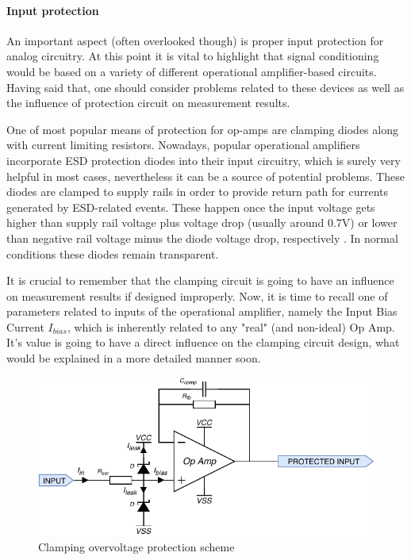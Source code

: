 \documentclass[12pt,a4paper]{article}
\begin{document}
\paragraph{Input protection}
An important aspect (often overlooked though) is proper input protection for analog circuitry. At this point it is vital to highlight that signal conditioning would be based on a variety of different operational amplifier-based circuits. Having said that, one should consider problems related to these devices as well as the influence of protection circuit on measurement results.
\par

One of most popular means of protection for op-amps are clamping diodes along with current limiting resistors. Nowadays, popular operational amplifiers incorporate ESD protection diodes into their input circuitry, which is surely very helpful in most cases, nevertheless it can be a source of potential problems. These diodes are clamped to supply rails in order to provide return path for currents generated by ESD-related events. These happen once the input voltage gets higher than supply rail voltage plus voltage drop (usually around 0.7V) or lower than negative rail voltage minus the diode voltage drop, respectively \cite{clamping}. In normal conditions these diodes remain transparent. 
\par

It is crucial to remember that the clamping circuit is going to have an influence on measurement results if designed improperly. Now, it is time to recall one of parameters related to inputs of the operational amplifier, namely the Input Bias Current $I_{bias}$, which is inherently related to any "real" (and non-ideal) Op Amp. It's value is going to have a direct influence on the clamping circuit design, what would be explained in a more detailed manner soon.
\par

\begin{figure}[ht!]
\includegraphics[scale=1.2]{input1.pdf}
\caption{Clamping overvoltage protection scheme}
\label{fig:input1}
\end{figure}
\end{document}

